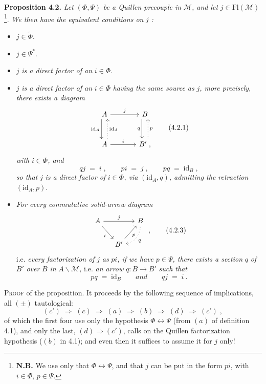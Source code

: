 \documentclass[11pt]{article}
\newcommand{\printedpage}[1]{\marginpar{\footnotesize p.~#1}}
\newcommand{\msp}[1]{\marginpar{\footnotesize [#1]}}
\newcommand{\Fl}{\mathrm{Fl}}
\newcommand{\id}{\mathrm{id}}
\begin{document}
\textbf{Proposition 4.2.} \textit{Let} $(\Phi,\Psi)$ \textit{be a Quillen precouple in} $\mathcal{M}$\textit{, and let} $j\in\Fl(\mathcal{M})$\footnote[9]{\textbf{N.B.} We use only that $\Phi\longleftrightarrow\Psi$, and that $j$ can be put in the form $pi$, with $i\in\Phi$, $p\in\Psi$.}. %
\textit{We then have the equivalent conditions on} $j$ \textit{:}
\begin{itemize}[leftmargin=2.5em]
\item[a)] $j\in\widetilde{\Phi}$.
\item[b)] $j\in\Psi^*$.
\item[c)] $j$ \textit{is a direct factor of an} $i\in\Phi$.
\item[c$'$)] $j$ \textit{is a direct factor of an} $i\in\Phi$ \textit{having the same source as} $j$\textit{, more precisely, there exists a diagram}
\[
\begin{tikzcd}[row sep=large, column sep=large]
A \arrow[r, "j"] \arrow[d, shift right=1ex, "\id_A"'] & B \arrow[d, shift right=1ex, "q"'] \\
A \arrow[u, dotted, shift right=1ex, "\id_A"'] \arrow[r, "i"] & B' \;, \arrow[u, dotted, shift right=1ex, "p"']
\end{tikzcd}
\tag*{(4.2.1)}
\]
\printedpage{20}
\textit{with} $i\in\Phi$\textit{, and}
\[
qj \;=\; i\;, \qquad pi \;=\; j\;, \qquad pq \;=\; \id_B\;,
\tag*{(4.2.2)}
\]
\textit{so that} $j$ \textit{is a direct factor of} $i\in\Phi$\textit{, via} $(\id_A,q)$\textit{, admitting the retraction} $(\id_A,p)$.
\item[d)] \textit{For every commutative solid-arrow diagram}
\[
\begin{tikzcd}[column sep=small]
A \arrow[rr, "j"] \arrow[dr, "i"'] & & B \arrow[dl, dotted, bend left=40, "q"] \\
& B' \arrow[ur, "p"'] &
\end{tikzcd}
\;,
\tag*{(4.2.3)}
\]
i.e. \textit{every factorization of} $j$ \textit{as} $pi$\textit{, if we have} $p\in\Psi$\textit{, there exists a section} $q$ \textit{of} $B'$ \textit{over} $B$ \textit{in} $A\backslash\mathcal{M}$\textit{,} i.e. \textit{an arrow} $q:B\longrightarrow B'$ \textit{such that}
\[
pq \;=\; \id_B \qquad \textit{and} \qquad qj \;=\; i\ .
\]
\end{itemize}

\textsc{Proof} of the proposition. It proceeds by the following sequence of implications, all $(\pm)$ tautological:
\[
(c') \;\Longrightarrow\; (c) \;\Longrightarrow\; (a) \;\Longrightarrow\; (b) \;\Longrightarrow\; (d) \;\Longrightarrow\; (c')\;,
\]
\msp{page 30}
of which the first four use only the hypothesis $\Phi\longleftrightarrow\Psi$ (from $(a)$ of definition 4.1), and only the last, $(d)\Longrightarrow(c')$, calls on the Quillen factorization hypothesis ($(b)$ in 4.1); and even then it suffices to assume it for $j$ only!
\end{document}
